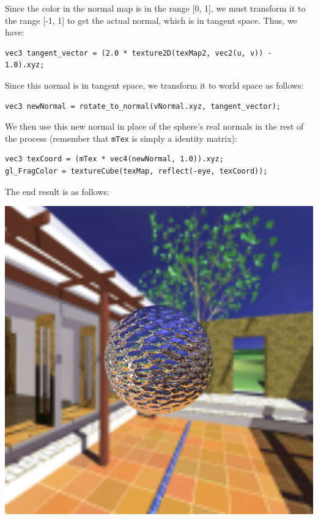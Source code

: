 \documentclass[12pt]{article}
\begin{document}
Since the color in the normal map is in the range [0, 1], we must transform it to the range [-1, 1] to get the actual normal, which is in tangent space. Thus, we have:

\begin{verbatim}
vec3 tangent_vector = (2.0 * texture2D(texMap2, vec2(u, v)) - 1.0).xyz;
\end{verbatim}

Since this normal is in tangent space, we transform it to world space as follows:

\begin{verbatim}
vec3 newNormal = rotate_to_normal(vNormal.xyz, tangent_vector);
\end{verbatim}

We then use this new normal in place of the sphere's real normals in the rest of the process (remember that \texttt{mTex} is simply a identity matrix):

\begin{verbatim}
vec3 texCoord = (mTex * vec4(newNormal, 1.0)).xyz;    
gl_FragColor = textureCube(texMap, reflect(-eye, texCoord));
\end{verbatim}

The end result is as follows:

\begin{center}
\includegraphics[scale=0.4]{images/part4}
\end{center}
\end{document}
